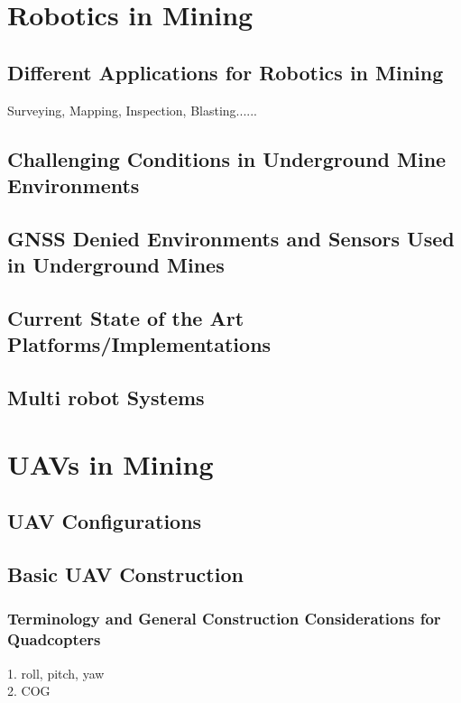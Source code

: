 \section{Robotics in Mining}

\subsection{Different Applications for Robotics in Mining}
Surveying, Mapping, Inspection, Blasting......


\subsection{Challenging Conditions in Underground Mine Environments}

\subsection{GNSS Denied Environments and Sensors Used in Underground Mines}

\subsection{Current State of the Art Platforms/Implementations}

\subsection{Multi robot Systems}


\section{UAVs in Mining}

\subsection{UAV Configurations}

\subsection{Basic UAV Construction}

\subsubsection{Terminology and General Construction Considerations for Quadcopters}
1. roll, pitch, yaw\\
2. COG

